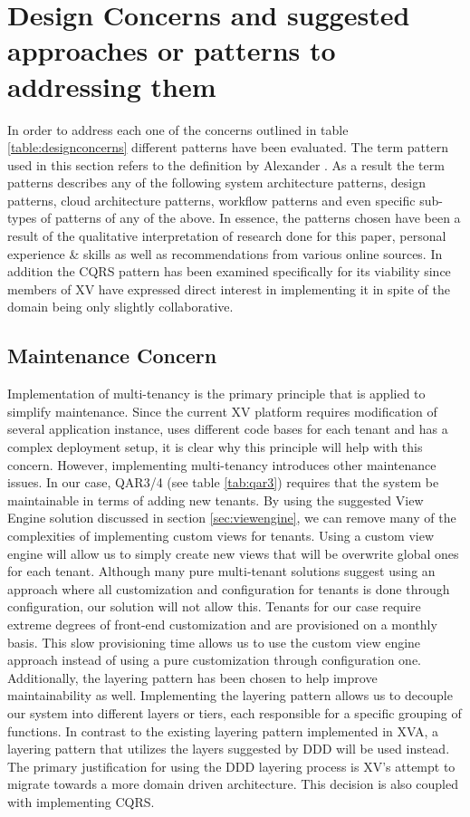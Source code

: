 \section{Design Concerns and suggested approaches or patterns to addressing them}
In order to address each one of the concerns outlined in table \ref{table:designconcerns} different patterns have been evaluated. The term pattern used in this section refers to the definition by Alexander \cite{Alexander1977-ni}. As a result the term patterns describes any of the following system architecture patterns, design patterns, cloud architecture patterns, workflow patterns and even specific sub-types of patterns of any of the above. In essence, the patterns chosen have been a result of the qualitative interpretation of research done for this paper, personal experience \& skills as well as recommendations from various online sources. In addition the CQRS pattern has been examined specifically for its viability since members of XV have expressed direct interest in implementing it in spite of the domain being only slightly collaborative. 

\subsection{Maintenance Concern}
Implementation of multi-tenancy is the primary principle that is applied to simplify maintenance. Since the current XV platform requires modification of several application instance, uses different code bases for each tenant and has a complex deployment setup, it is clear why this principle will help with this concern. However, implementing multi-tenancy introduces other maintenance issues. In our case, QAR3/4 (see table \ref{tab:qar3}) requires that the system be maintainable in terms of adding new tenants. By using the suggested View Engine solution  discussed in section \ref{sec:viewengine}, we can remove many of the complexities of implementing custom views for tenants. Using a custom view engine will allow us to simply create new views that will be overwrite global ones for each tenant. Although many pure multi-tenant solutions suggest using an approach where all customization and configuration for tenants is done through configuration, our solution will not allow this. Tenants for our case require extreme degrees of front-end customization and are provisioned on a monthly basis. This slow provisioning time allows us to use the custom view engine approach instead of using a pure customization through configuration one. Additionally, the layering pattern has been chosen to help improve maintainability as well. Implementing the layering pattern allows us to decouple our system into different layers or tiers, each responsible for a specific grouping of functions. In contrast to the existing layering pattern implemented in XVA, a layering pattern that utilizes the layers suggested by DDD will be used instead. The primary justification for using the DDD layering process is XV's attempt to migrate towards a more domain driven architecture. This decision is also coupled with implementing CQRS.


